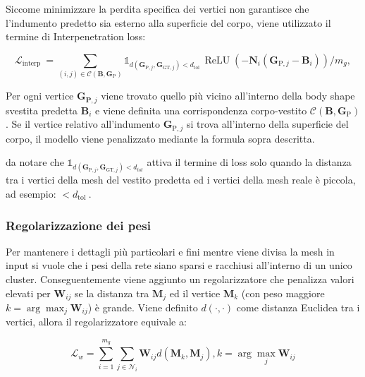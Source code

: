 \medskip

Siccome minimizzare la perdita specifica dei vertici non garantisce che l'indumento predetto sia esterno alla superficie del corpo, viene utilizzato il termine di Interpenetration loss: 

$$
\mathcal{L}_{\text {interp }}=\sum_{(i, j) \in \mathcal{C}\left(\mathbf{B}, \mathbf{G}_{\mathrm{P}}\right)} \mathbb{1}_{d\left(\mathbf{G}_{\mathrm{P}, j}, \boldsymbol{G}_{\mathrm{GT}, j}\right)<d_{\text {tol }}} \operatorname{ReLU}\left(-\mathbf{N}_{i}\left(\mathbf{G}_{\mathrm{P}, j}-\mathbf{B}_{i}\right)\right) / m_{g},
$$

\medskip

Per ogni vertice $\mathbf{G}_{\mathbf{P}, j}$ viene trovato quello più vicino all'interno della body shape svestita predetta  $\mathbf{B}_{i}$ e viene definita una corrispondenza corpo-vestito $\mathcal{C}\left(\mathbf{B}, \mathbf{G}_{\mathrm{P}}\right)$. Se il vertice relativo all'indumento $\mathbf{G}_{\mathrm{P}, j}$ si trova all'interno della superficie del corpo, il modello viene penalizzato mediante la formula sopra descritta.

da notare che $\mathbb{1}_{d\left(\mathbf{G}_{\mathrm{P}, j}, \boldsymbol{G}_{\mathrm{GT}, j}\right)<d_{t o l}}$ attiva il termine di loss solo quando la distanza tra i vertici della mesh del vestito predetta ed i vertici della mesh reale è piccola, ad esempio: $<d_{\text {tol }}$.





\medskip

\subsubsection{Regolarizzazione dei pesi}

\medskip

Per mantenere i dettagli più particolari e fini mentre viene divisa la mesh in input si vuole che i pesi della rete siano sparsi e racchiusi all'interno di un unico cluster. Conseguentemente viene aggiunto un regolarizzatore che penalizza valori elevati per $\mathbf{W}_{i j}$ se la distanza tra $\mathbf{M}_{j}$ ed il vertice $\mathbf{M}_{k}$ (con peso maggiore $k=\arg \max _{j} \mathbf{W}_{i j}$) è grande. Viene definito $d(\cdot, \cdot)$ come distanza Euclidea tra i vertici, allora il regolarizzatore equivale a:

\medskip

$$
\mathcal{L}_{w}=\sum_{i=1}^{m_{g}} \sum_{j \in \mathcal{N}_{i}} \mathbf{W}_{i j} d\left(\mathbf{M}_{k}, \mathbf{M}_{j}\right), k=\arg \max _{j} \mathbf{W}_{i j}
$$

